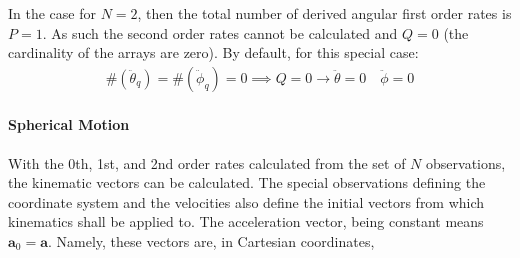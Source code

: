 \documentclass[letterpaper,11pt,english]{sphinxmanual}
\begin{document}
\sphinxAtStartPar
In the case for \(N=2\), then the total number of derived angular first
order rates is \(P=1\). As such the second order rates cannot be
calculated and \(Q=0\) (the cardinality of the arrays are zero). By
default, for this special case:
\begin{equation*}
\begin{split}\#(\ddot\theta_q) = \#(\ddot\phi_q) = 0 \implies Q = 0 \longrightarrow \ddot\theta = 0 \quad \ddot\phi = 0\end{split}
\end{equation*}

\paragraph{Spherical Motion}
\label{\detokenize{technical/algorithms/spherical_kinematics:spherical-motion}}
\sphinxAtStartPar
With the 0th, 1st, and 2nd order rates calculated from the set of \(N\)
observations, the kinematic vectors can be calculated. The special
observations defining the coordinate system and the velocities also define
the initial vectors from which kinematics shall be applied to. The
acceleration vector, being constant means \(\mathbf{a}_0 = \mathbf{a}\).
Namely, these vectors are, in Cartesian coordinates,
\end{document}
